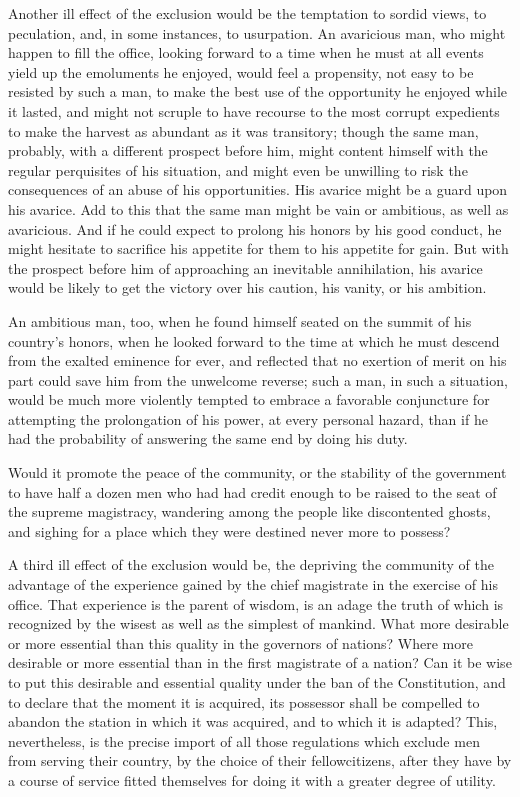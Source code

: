 Another ill effect of the exclusion would be the temptation to sordid views, to peculation, and, in some instances, to usurpation. 
An avaricious man, who might happen to fill the office, looking forward to a time when he must at all events yield up the emoluments he enjoyed, would feel a propensity, not easy to be resisted by such a man, to make the best use of the opportunity he enjoyed while it lasted, and might not scruple to have recourse to the most corrupt expedients to make the harvest as abundant as it was transitory; though the same man, probably, with a different prospect before him, might content himself with the regular perquisites of his situation, and might even be unwilling to risk the consequences of an abuse of his opportunities. 
His avarice might be a guard upon his avarice. 
Add to this that the same man might be vain or ambitious, as well as avaricious. 
And if he could expect to prolong his honors by his good conduct, he might hesitate to sacrifice his appetite for them to his appetite for gain. 
But with the prospect before him of approaching an inevitable annihilation, his avarice would be likely to get the victory over his caution, his vanity, or his ambition.

An ambitious man, too, when he found himself seated on the summit of his country's honors, when he looked forward to the time at which he must descend from the exalted eminence for ever, and reflected that no exertion of merit on his part could save him from the unwelcome reverse; such a man, in such a situation, would be much more violently tempted to embrace a favorable conjuncture for attempting the prolongation of his power, at every personal hazard, than if he had the probability of answering the same end by doing his duty.

Would it promote the peace of the community, or the stability of the government to have half a dozen men who had had credit enough to be raised to the seat of the supreme magistracy, wandering among the people like discontented ghosts, and sighing for a place which they were destined never more to possess?

A third ill effect of the exclusion would be, the depriving the community of the advantage of the experience gained by the chief magistrate in the exercise of his office. 
That experience is the parent of wisdom, is an adage the truth of which is recognized by the wisest as well as the simplest of mankind. 
What more desirable or more essential than this quality in the governors of nations? 
Where more desirable or more essential than in the first magistrate of a nation? 
Can it be wise to put this desirable and essential quality under the ban of the Constitution, and to declare that the moment it is acquired, its possessor shall be compelled to abandon the station in which it was acquired, and to which it is adapted? 
This, nevertheless, is the precise import of all those regulations which exclude men from serving their country, by the choice of their fellowcitizens, after they have by a course of service fitted themselves for doing it with a greater degree of utility.

